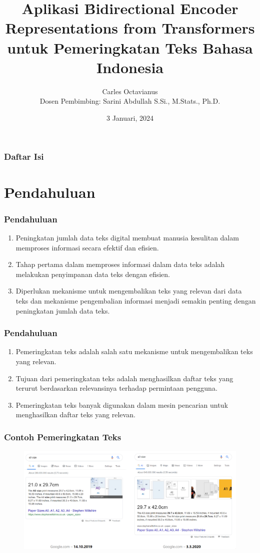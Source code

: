 \documentclass{beamer}
\title{Aplikasi \f{Bidirectional Encoder Representations from Transformers} untuk Pemeringkatan Teks Bahasa Indonesia}
\author{Carles Octavianus \\ Dosen Pembimbing: Sarini Abdullah S.Si., M.Stats., Ph.D.}
\date{3 Januari, 2024}
\begin{document}
\frame{\titlepage}




\begin{frame}
    \frametitle{Daftar Isi}
    \tableofcontents
\end{frame}


\section{Pendahuluan}
\begin{frame}
    \frametitle{Pendahuluan}

\begin{enumerate}
    \item Peningkatan jumlah data teks digital membuat manusia kesulitan dalam memproses informasi secara efektif dan efisien.
    \item Tahap pertama dalam memproses informasi dalam data teks adalah melakukan penyimpanan data teks dengan efisien.
    \item Diperlukan mekanisme untuk mengembalikan teks yang relevan dari data teks dan mekanisme pengembalian informasi menjadi semakin penting dengan peningkatan jumlah data teks.
\end{enumerate}
\end{frame}

\begin{frame}
    \frametitle{Pendahuluan}
    \begin{enumerate}
    \item Pemeringkatan teks adalah salah satu mekanisme untuk mengembalikan teks yang relevan.
    \item Tujuan dari pemeringkatan teks adalah menghasilkan daftar teks yang terurut berdasarkan relevansinya terhadap permintaan pengguna.
    \item Pemeringkatan teks banyak digunakan dalam mesin pencarian untuk menghasilkan daftar teks yang relevan.
    \end{enumerate}
\end{frame}


\begin{frame}
    \frametitle{Contoh Pemeringkatan Teks}
    \begin{figure}
        \centering
        \includegraphics[width=1\textwidth]{assets/pics/google-ir.png}  
    \end{figure}
\end{frame}
\end{document}
